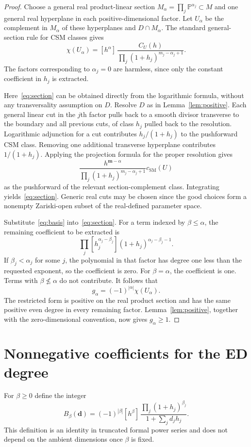 \documentclass[11pt]{article}
\theoremstyle{remark}\newtheorem{remark}[theorem]{Remark}
\newcommand{\PP}{\mathbb P}
\newcommand{\csm}{c_{\mathrm{SM}}}
\begin{document}
\begin{proof}
Choose a general real product-linear section
$M_\alpha=\prod_j\PP^{\alpha_j}\subset M$ and one general real hyperplane in each positive-dimensional factor. Let $U_\alpha$ be the complement in $M_\alpha$ of these hyperplanes and $D\cap M_\alpha$. The standard general-section rule for CSM classes gives
\begin{equation}\label{eq:section}
 \chi(U_\alpha)=
 [h^\alpha]\,
 \frac{C_U(h)}{\prod_j(1+h_j)^{m_j-\alpha_j+1}}.
\end{equation}
The factors corresponding to $\alpha_j=0$ are harmless, since only the constant coefficient in $h_j$ is extracted.

Here~\eqref{eq:section} can be obtained directly from the logarithmic formula, without any transversality assumption on $D$. Resolve $D$ as in Lemma~\ref{lem:positive}. Each general linear cut in the $j$th factor pulls back to a smooth divisor transverse to the boundary and all previous cuts, of class $h_j$ pulled back to the resolution. Logarithmic adjunction for a cut contributes $h_j/(1+h_j)$ to the pushforward CSM class. Removing one additional transverse hyperplane contributes $1/(1+h_j)$. Applying the projection formula for the proper resolution gives
\[
 \frac{h^{\mathbf m-\alpha}}{\prod_j(1+h_j)^{m_j-\alpha_j+1}}
 \csm(U)
\]
as the pushforward of the relevant section-complement class. Integrating yields~\eqref{eq:section}. Generic real cuts may be chosen since the good choices form a nonempty Zariski-open subset of the real-defined parameter space.

Substitute~\eqref{eq:basis} into~\eqref{eq:section}. For a term indexed by $\beta\leq\alpha$, the remaining coefficient to be extracted is
\[
 \prod_j[h_j^{\alpha_j-\beta_j}](1+h_j)^{\alpha_j-\beta_j-1}.
\]
If $\beta_j<\alpha_j$ for some $j$, the polynomial in that factor has degree one less than the requested exponent, so the coefficient is zero. For $\beta=\alpha$, the coefficient is one. Terms with $\beta\not\leq\alpha$ do not contribute. It follows that
\begin{equation}\label{eq:g-euler}
 g_\alpha=(-1)^{|\alpha|}\chi(U_\alpha).
\end{equation}
The restricted form is positive on the real product section and has the same positive even degree in every remaining factor. Lemma~\ref{lem:positive}, together with the zero-dimensional convention, now gives $g_\alpha\geq1$.
\end{proof}

\section{Nonnegative coefficients for the ED degree}
For $\beta\geq0$ define the integer
\begin{equation}\label{eq:weights}
 B_\beta(\mathbf d)=
 (-1)^{|\beta|}[h^\beta]\,
 \frac{\prod_j(1+h_j)^{\beta_j}}{1+\sum_jd_jh_j}.
\end{equation}
This definition is an identity in truncated formal power series and does not depend on the ambient dimensions once $\beta$ is fixed.
\end{document}
